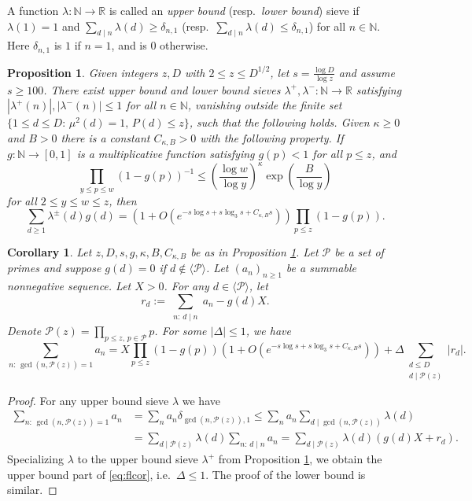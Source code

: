 \documentclass{article}
\theoremstyle{plain}
\newtheorem{proposition}[thm]{Proposition}
\newtheorem{cor}[thm]{Corollary}
\theoremstyle{remark}
\newcommand{\RR}{\mathbb{R}}
\newcommand{\NN}{\mathbb{N}}
\newcommand{\Pa}{\mathcal{P}}
\numberwithin{equation}{section}
\begin{document}
A function $\lambda\colon \NN\to \RR$ is called an \textit{upper bound} (resp.~\textit{lower bound}) sieve if $\lambda(1)=1$ and $\sum_{d\mid n}\lambda(d)\ge \delta_{n,1}$ (resp.~$\sum_{d\mid n}\lambda(d)\le \delta_{n,1}$) for all $n\in \NN$. Here $\delta_{n,1}$ is $1$ if $n=1$, and is $0$ otherwise.

 
\begin{proposition}\cite[Theorem 3.6(a)]{FordNotes}\label{prop:sieve}
Given integers $z,D$ with $2\le z\le D^{1/2}$, let $s=\tfrac{\log D}{\log z}$ and assume $s\ge 100$. There exist upper bound and lower bound sieves $\lambda^+,\lambda^-\colon \NN\to \RR$ satisfying $|\lambda^+(n)|, |\lambda^-(n)|\le 1$ for all $n\in \NN$, vanishing outside the finite set $\{1 \le d \le D:\, \mu^2(d)=1,\, P(d)\le z\}$, such that the following holds. Given $\kappa\ge 0$ and $B>0$ there is a constant $C_{\kappa,B}>0$ with the following property.  If $g\colon \NN\to [0,1]$ is a multiplicative function satisfying $g(p)<1$ for all $p\le z$, and
\begin{equation}\label{eq:iwanieccond}
\prod_{y\le p\le w}(1-g(p))^{-1} \le \left( \frac{\log w}{\log y}\right)^{\kappa} \exp\left( \frac{B}{\log y}\right)
\end{equation}
for all $2\le y \le w \le z$, then
\[ \sum_{d\ge 1} \lambda^{\pm}(d) g(d)=\left(1+O\left(e^{-s\log s+s\log_3 s+C_{\kappa,B}s}\right)\right)\prod_{p\le z}(1-g(p)).\]
\end{proposition}
\begin{cor}\cite[Theorem 3.6(b)]{FordNotes}\label{cor:fl}
Let $z,D,s,g,\kappa,B,C_{\kappa,B}$ be as in Proposition \ref{prop:sieve}. Let $\Pa$ be a set of primes and suppose $g(d)=0$ if $d\not\in\langle \Pa\rangle$. Let $(a_n)_{n\ge 1}$ be a summable nonnegative sequence. Let $X>0$. For any $d \in \langle \Pa\rangle$, let
\[ r_d:= \sum_{\substack{n:\, d \mid n}} a_n - g(d)X.\] 
Denote $\Pa(z) = \prod_{p\le z,\, p \in \Pa}p$. For some $|\Delta|\le 1$, we have
\begin{equation}\label{eq:flcor}
\sum_{n:\,  \gcd(n,\Pa(z))=1}a_n = X\prod_{p\le z} (1-g(p))(1+O(e^{-s\log s + s\log_3 s +C_{\kappa,B}s}))+\Delta\sum_{\substack{d\le D\\ d\mid \Pa(z)}}|r_d|.
\end{equation}
\end{cor}
\begin{proof}
For any upper bound sieve $\lambda$ we have
\begin{align*}
\sum_{n: \, \gcd(n,\Pa(z))=1} a_n&=\sum_{n} a_n \delta_{\gcd(n,\Pa(z)),1}\le \sum_{n} a_n \sum_{d\mid \gcd(n,\Pa(z))} \lambda(d) \\
&= \sum_{d \mid \Pa(z)}\lambda(d) \sum_{n:\, d\mid n}a_n= \sum_{d \mid \Pa(z)}\lambda(d) \left( g(d) X + r_d\right).
\end{align*}
Specializing $\lambda$ to the upper bound sieve $\lambda^+$ from Proposition \ref{prop:sieve}, we obtain the upper bound part of \eqref{eq:flcor}, i.e.~$\Delta\le 1$. The proof of the lower bound is similar.
\end{proof}
\end{document}
